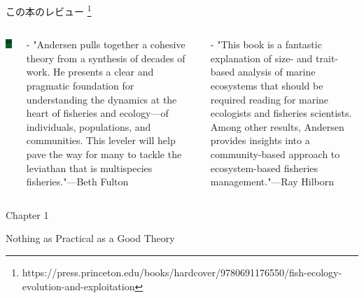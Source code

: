 \documentclass[
  ignorenonframetext,
]{beamer}
\newcommand{\vspacesmall}{\vspace{3mm}}
\begin{document}
\begin{frame}{この本のレビュー
\footnote[frame]{https://press.princeton.edu/books/hardcover/9780691176550/fish-ecology-evolution-and-exploitation}}
\protect\hypertarget{ux3053ux306eux672cux306eux30ecux30d3ux30e5ux30fc}{}

\begin{columns}


\includegraphics[width=80px]{FishEcoEvoBook} 


- "Andersen pulls together a cohesive theory from a synthesis of decades of work. He presents a clear and pragmatic foundation for understanding the dynamics at the heart of fisheries and ecology—of individuals, populations, and communities. This leveler will help pave the way for many to tackle the leviathan that is multispecies fisheries."—Beth Fulton\pause

\vspacesmall
- "This book is a fantastic explanation of size- and trait-based analysis of marine ecosystems that should be required reading for marine ecologists and fisheries scientists. Among other results, Andersen provides insights into a community-based approach to ecosystem-based fisheries management."—Ray Hilborn

\end{columns}

\end{frame}

\begin{frame}

\begin{LARGE} 
\begin{center}
\begin{bf}
Chapter 1  
  
Nothing as Practical as a Good Theory
\end{bf}
\end{center}
\end{LARGE}

\end{frame}
\end{document}
